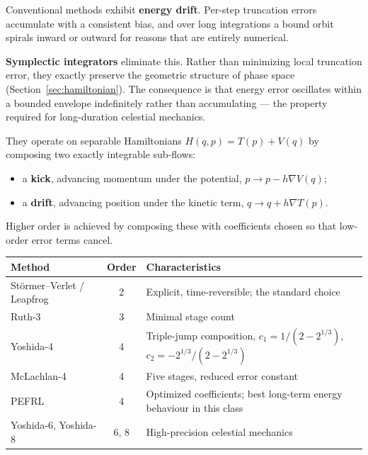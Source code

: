 \documentclass[11pt,a4paper]{article}
\begin{document}
Conventional methods exhibit \textbf{energy drift}. Per-step truncation errors accumulate with a
consistent bias, and over long integrations a bound orbit spirals inward or outward for reasons that
are entirely numerical.

\textbf{Symplectic integrators} eliminate this. Rather than minimizing local truncation error, they
exactly preserve the geometric structure of phase space (Section~\ref{sec:hamiltonian}). The
consequence is that energy error oscillates within a bounded envelope indefinitely rather than
accumulating --- the property required for long-duration celestial mechanics.

They operate on separable Hamiltonians $H(q,p) = T(p) + V(q)$ by composing two exactly integrable
sub-flows:

\begin{itemize}[leftmargin=1.4em,itemsep=0.2em]
  \item a \textbf{kick}, advancing momentum under the potential, $p \to p - h\nabla V(q)$;
  \item a \textbf{drift}, advancing position under the kinetic term, $q \to q + h\nabla T(p)$.
\end{itemize}

Higher order is achieved by composing these with coefficients chosen so that low-order error terms
cancel.

\begin{center}
\begin{tabular}{@{}lcL{7.0cm}@{}}
\toprule
\textbf{Method} & \textbf{Order} & \textbf{Characteristics} \\
\midrule
St\"ormer--Verlet / Leapfrog & 2    & Explicit, time-reversible; the standard choice \\
Ruth-3                       & 3    & Minimal stage count \\
Yoshida-4                    & 4    & Triple-jump composition,
                                      $c_1 = 1/(2 - 2^{1/3})$, $c_2 = -2^{1/3}/(2 - 2^{1/3})$ \\
McLachlan-4                  & 4    & Five stages, reduced error constant \\
PEFRL                        & 4    & Optimized coefficients; best long-term energy behaviour in
                                      this class \\
Yoshida-6, Yoshida-8         & 6, 8 & High-precision celestial mechanics \\
\bottomrule
\end{tabular}
\end{center}
\end{document}
